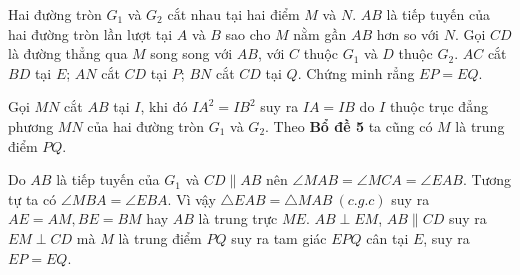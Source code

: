\begin{prob}[IMO 2000/1]
	Hai đường tròn $G_1$ và $G_2$ cắt nhau tại hai điểm $M$ và $N$. $AB$ là tiếp tuyến của hai đường tròn lần lượt tại $A$ và $B$ sao cho $M$ nằm gần $AB$ hơn so với $N$. Gọi $CD$ là đường thẳng qua $M$ song song với $AB$, với $C$ thuộc $G_1$ và $D$ thuộc $G_2$. $AC$ cắt $BD$ tại $E$; $AN$ cắt $CD$ tại $P$; $BN$ cắt $CD$ tại $Q$. Chứng minh rẳng $EP = EQ$.
\end{prob}

\begin{center}

\end{center}

Gọi $MN$ cắt $AB$ tại $I$, khi đó $IA^2 = IB^2$ suy ra $IA = IB$ do $I$ thuộc trục đẳng phương $MN$ của hai đường tròn $G_1$ và $G_2$. Theo \textbf{Bổ đề 5} ta cũng có $M$ là trung điểm $PQ$.

Do $AB$ là tiếp tuyến của $G_1$ và $CD \parallel AB$ nên $\angle MAB = \angle MCA = \angle EAB$. Tương tự ta có $\angle MBA = \angle EBA$. Vì vậy $\triangle EAB = \triangle MAB \ (c.g.c)$ suy ra $AE = AM, BE = BM$ hay $AB$ là trung trực $ME$. $AB \perp EM$, $AB \parallel CD$ suy ra $EM \perp CD$ mà $M$ là trung điểm $PQ$ suy ra tam giác $EPQ$ cân tại $E$, suy ra $EP = EQ$.